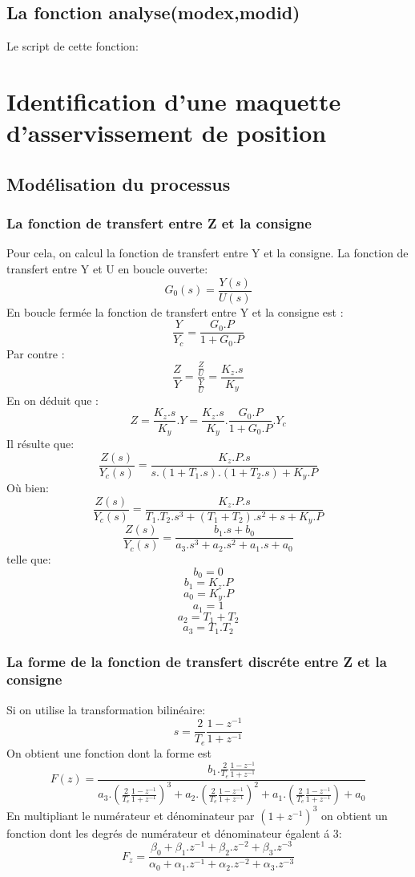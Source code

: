 \documentclass[twoside,twocolumn]{article}
\begin{document}
\subsection{La fonction analyse(modex,modid)}
Le script de cette fonction:
\label{matlab}



\section{Identification d'une maquette d'asservissement de position}
\subsection{Modélisation du processus}

\subsubsection{La fonction de transfert entre Z et la consigne}
Pour cela, on calcul la fonction de transfert entre Y et la consigne.
La fonction de transfert entre Y et U en boucle ouverte: $$G_0(s)=\frac{Y(s)}{U(s)} $$
En boucle fermée la fonction de transfert entre Y et la consigne est : $$ \frac{Y}{Y_c}=\frac{G_0.P}{1+G_0.P}$$
Par contre : $$ \frac{Z}{Y} = \frac{\frac{Z}{U}}{\frac{Y}{U}}=\frac{K_z.s}{K_y}$$
En on déduit que : $$ Z = \frac{K_z.s}{K_y}.Y = \frac{K_z.s}{K_y}.\frac{G_0.P}{1+G_0.P}.Y_c$$
Il résulte que: $$\frac{Z(s)}{Y_c(s)} = \frac{K_z.P.s}{s.(1+T_1.s).(1+T_2.s)+K_y.P}$$
Où bien:
$$\frac{Z(s)}{Y_c(s)} = \frac{K_z.P.s}{T_1.T_2.s^3+(T_1+T_2).s^2 + s +K_y.P}$$
$$\frac{Z(s)}{Y_c(s)} = \frac{b_1.s + b_0}{a_3.s^3 + a_2.s^2 + a_1.s + a_0}$$
telle que:\\

$$b_0 = 0$$  $$b_1 = K_z.P$$ $$a_0 = K_y.P$$ $$a_1 = 1$$ $$a_2 = T_1+T_2$$ $$a_3 = T_1.T_2$$


\subsubsection{La forme de la fonction de transfert discréte entre Z et la consigne}
Si on utilise la transformation bilinéaire: $$ s = \frac{2}{T_e}\frac{1-z^{-1}}{1+z^{-1}}$$ 
On obtient une fonction dont la forme est 
$$F(z) = \frac{b_1.\frac{2}{T_e}\frac{1-z^{-1}}{1+z^{-1}}}{a_3.(\frac{2}{T_e}\frac{1-z^{-1}}{1+z^{-1}})^3 + a_2.(\frac{2}{T_e}\frac{1-z^{-1}}{1+z^{-1}})^2 + a_1.(\frac{2}{T_e}\frac{1-z^{-1}}{1+z^{-1}}) + a_0}$$
En multipliant le numérateur et dénominateur par $(1+z^{-1})^3$ on obtient un fonction dont les degrés de numérateur et dénominateur égalent á 3:
$$ F_z = \frac{\beta_0 + \beta_1.z^{-1}+\beta_2.z^{-2}+\beta_3.z^{-3}}{\alpha_0 + \alpha_1.z^{-1}+ \alpha_2.z^{-2}+ \alpha_3.z^{-3}}$$
\end{document}
